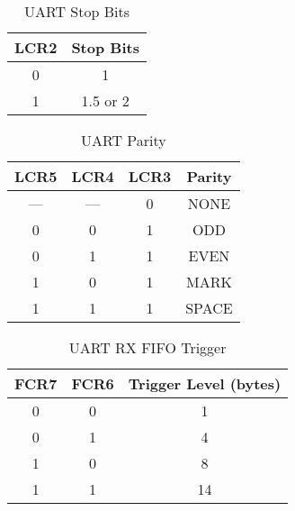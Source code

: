 \begin{table}[ht]
    \begin{center}
        \begin{tabular}{|c|c|} \hline
            LCR2 & Stop Bits \\ \hline\hline
            0 & 1 \\ \hline
            1 & 1.5 or 2 \\ \hline
        \end{tabular}
    \end{center}
    \caption{UART Stop Bits}
    \label{tab:uart_stop}
\end{table}

\begin{table}[ht]
    \begin{center}
        \begin{tabular}{|c|c|c|c|} \hline
            LCR5 & LCR4 & LCR3 & Parity \\ \hline\hline
            --- & --- & 0 & NONE \\ \hline
            0 & 0 & 1 & ODD \\ \hline
            0 & 1 & 1 & EVEN \\ \hline
            1 & 0 & 1 & MARK \\ \hline
            1 & 1 & 1 & SPACE \\ \hline
        \end{tabular}
    \end{center}
    \caption{UART Parity}
    \label{tab:uart_parity}
\end{table}

\begin{table}[ht]
    \begin{center}
        \begin{tabular}{|c|c|c|} \hline
            FCR7 & FCR6 & Trigger Level (bytes) \\ \hline\hline
            0 & 0 & 1 \\ \hline
            0 & 1 & 4 \\ \hline
            1 & 0 & 8 \\ \hline
            1 & 1 & 14 \\ \hline
        \end{tabular}
    \end{center}
    \caption{UART RX FIFO Trigger}
    \label{tab:uart_rx_trig}
\end{table}

